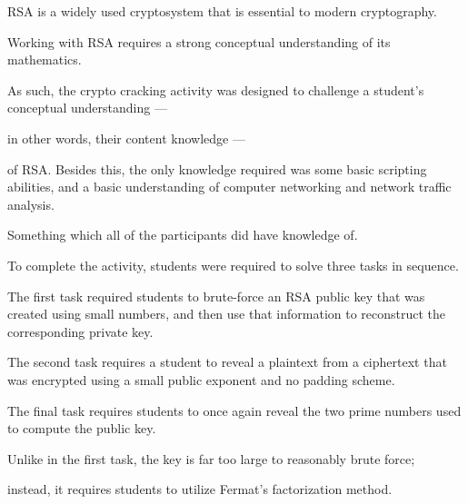 


    RSA is a widely used cryptosystem that is essential to modern cryptography. %



Working with RSA requires a strong conceptual understanding of its mathematics. %



As such, the crypto cracking activity was designed to challenge a student's conceptual understanding ---%



 in other words, their content knowledge ---%



 of RSA. Besides this, the only knowledge required was some basic scripting abilities, and a basic understanding of computer networking and network traffic analysis. %



Something which all of the participants did have knowledge of. 







        



    To complete the activity, students were required to solve three tasks in sequence. %



The first task required students to brute-force an RSA public key that was created using small numbers, and then use that information to reconstruct the corresponding private key. %



The second task requires a student to reveal a plaintext from a ciphertext that was encrypted using a small public exponent and no padding scheme. %



The final task requires students to once again reveal the two prime numbers used to compute the public key. %



Unlike in the first task, the key is far too large to reasonably brute force; %



instead, it requires students to utilize Fermat's factorization method. 







